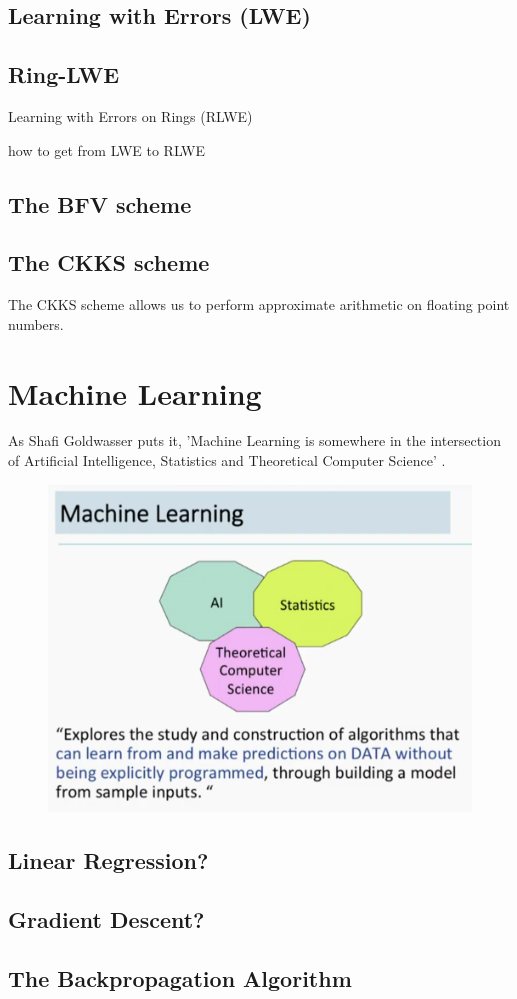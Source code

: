 \subsection{Learning with Errors (LWE)}

\subsection{Ring-LWE}
Learning with Errors on Rings (RLWE)

how to get from LWE to RLWE

\subsection{The BFV scheme}
\subsection{The CKKS scheme}
The CKKS scheme allows us to perform approximate arithmetic on floating point numbers.

\section{Machine Learning}
As Shafi Goldwasser puts it, 'Machine Learning is somewhere in the intersection of Artificial Intelligence, Statistics and Theoretical Computer Science' \cite{goldwasserTalk2018}.

\begin{figure}  %
  \includegraphics[width=0.4\linewidth]{figures/what-is-machine-learning.png}
\end{figure}

\subsection{Linear Regression?}
\subsection{Gradient Descent?}
\subsection{The Backpropagation Algorithm}
